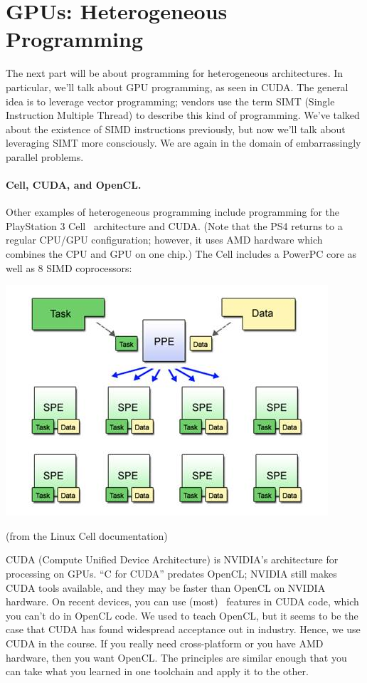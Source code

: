 




\section*{GPUs: Heterogeneous Programming}

The next part will be about programming for heterogeneous
architectures. In particular, we'll talk about GPU programming, as
seen in CUDA. The general idea is to
leverage vector programming; vendors use the term SIMT (Single
Instruction Multiple Thread) to describe this kind of
programming. We've talked about the existence of SIMD instructions
previously, but now we'll talk about leveraging SIMT more
consciously. We are again in the domain of embarrassingly parallel
problems.

\paragraph{Cell, CUDA, and OpenCL.} 
Other examples of heterogeneous programming include
programming for the PlayStation 3 Cell~\cite{cellprimer} architecture and CUDA. (Note that the PS4 returns to a regular CPU/GPU configuration; however, it uses AMD hardware which combines the CPU and GPU on one chip.) The Cell includes a PowerPC core as well as
8 SIMD coprocessors:

\begin{center}
\includegraphics[width=.4\textwidth]{images/cell.jpg}
\end{center}
\hfill (from the Linux Cell documentation)

CUDA (Compute Unified Device Architecture) is NVIDIA's architecture
for processing on GPUs. ``C for CUDA'' predates OpenCL; NVIDIA still
makes CUDA tools available, and they may be faster than OpenCL on NVIDIA
hardware. On recent devices, you can use (most) \CPP~features in CUDA code,
which you can't do in OpenCL code. We used to teach OpenCL, but it seems
to be the case that CUDA has found widespread acceptance out in industry.
Hence, we use CUDA in the course. If you really need cross-platform or 
you have AMD hardware, then you want OpenCL. The principles are similar 
enough that you can take what you learned in one toolchain and apply it 
to the other.

